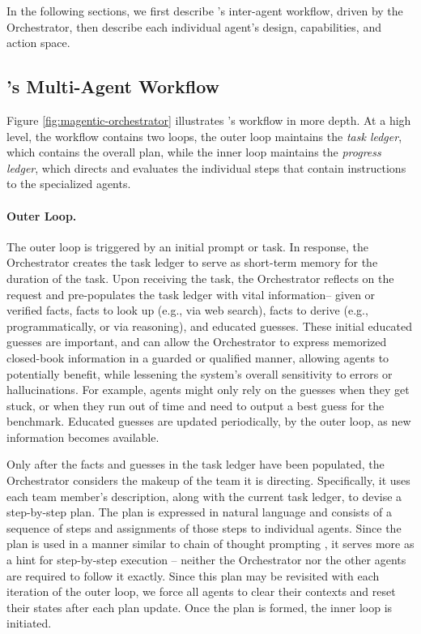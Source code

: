 In the following sections, we first describe \team's inter-agent workflow, driven by the Orchestrator, then describe each individual agent's design, capabilities, and action space.


\subsection{\team's Multi-Agent Workflow}
Figure \ref{fig:magentic-orchestrator} illustrates \team's workflow in more depth. At a high level, the workflow contains two loops, the outer loop maintains the {\em task ledger}, which contains the overall plan, while  the inner loop maintains the {\em progress ledger}, which directs and evaluates the individual steps that contain instructions to the specialized agents. 

\paragraph{Outer Loop.} The outer loop is triggered by an initial prompt or task. In response, the Orchestrator creates the task ledger to serve as short-term memory for the duration of the task. Upon receiving the task, the Orchestrator reflects on the request and pre-populates the task ledger with vital information-- given or verified facts, facts to look up (e.g., via web search), facts to derive (e.g., programmatically, or via reasoning), and educated guesses. These initial educated guesses are important, and can allow the Orchestrator to express memorized closed-book information in a guarded or qualified manner, allowing agents to potentially benefit, while lessening the system's overall sensitivity to errors or hallucinations. For example, agents might only rely on the guesses when they get stuck, or when they run out of time and need to output a best guess for the benchmark. Educated guesses are updated periodically, by the outer loop, as new information becomes available.

Only after the facts and guesses in the task ledger have been populated, the Orchestrator considers the makeup of the team it is directing. Specifically, it uses each team member's description, along with the current task ledger, to devise a step-by-step plan. The plan is expressed in natural language and consists of a sequence of steps and assignments of those steps to individual agents. Since the plan is used in a manner similar to chain of thought prompting \cite{wei2022chain}, it serves more as a hint for step-by-step execution -- neither the Orchestrator nor the other agents are required to follow it exactly.  Since this plan may be revisited with each iteration of the outer loop, we force all agents to clear their contexts and reset their states after each plan update. Once the plan is formed, the inner loop is initiated.


